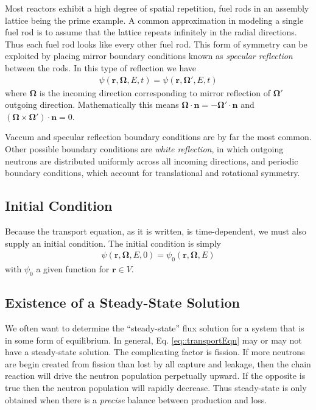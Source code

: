 \documentclass[11pt]{article}
\renewcommand\vec{\mathbf}
\begin{document}
Most reactors exhibit a high degree of spatial repetition, fuel rods in an assembly lattice being the prime example.  A common approximation in modeling a single fuel rod is to assume that the lattice repeats infinitely in the radial directions.  Thus each fuel rod looks like every other fuel rod.  This form of symmetry can be exploited by placing mirror boundary conditions known as \emph{specular reflection} between the rods.  In this type of reflection we have
\begin{align}
  \psi(\vec{r},\vec{\Omega},E,t) = \psi(\vec{r},\vec{\Omega}',E,t)
\end{align}
where \(\vec{\Omega}\) is the incoming direction corresponding to mirror reflection of \(\vec{\Omega}'\) outgoing direction.  Mathematically this means \(\vec{\Omega} \cdot \vec{n} = - \vec{\Omega}' \cdot \vec{n}\) and \(\left(\vec{\Omega} \times \vec{\Omega}'\right) \cdot \vec{n} = 0\).

Vaccum and specular reflection boundary conditions are by far the most common.  Other possible boundary conditions are \emph{white reflection}, in which outgoing neutrons are distributed uniformly across all incoming directions, and periodic boundary conditions, which account for translational and rotational symmetry.

\subsection{Initial Condition}
\label{sec:orgheadline6}
Because the transport equation, as it is written, is time-dependent, we must also supply an initial condition.  The initial condition is simply
\begin{align}
  \psi(\vec{r},\vec{\Omega},E,0) = \psi_0(\vec{r},\vec{\Omega},E)
\end{align}
with \(\psi_0\) a given function for \(\vec{r} \in V\).

\subsection{Existence of a Steady-State Solution}
\label{sec:orgheadline7}
We often want to determine the ``steady-state'' flux solution for a system that is in some form of equilibrium.  In general, Eq. \eqref{eq::transportEqn} may or may not have a steady-state solution.  The complicating factor is fission.  If more neutrons are begin created from fission than lost by all capture and leakage, then the chain reaction will drive the neutron population perpetually upward.  If the opposite is true then the neutron population will rapidly decrease.  Thus steady-state is only obtained when there is a \emph{precise} balance between production and loss.  
\end{document}
